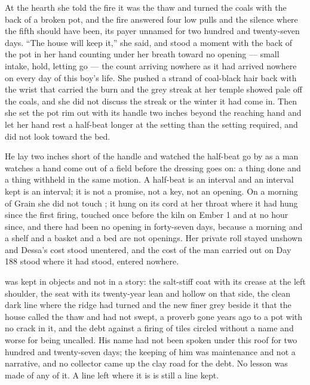 At the hearth she told the fire it was the thaw and turned the coals with the back of a broken pot, and the fire answered four low pulls and the silence where the fifth should have been, its payer unnamed for two hundred and twenty-seven days. “The house will keep it,” she said, and stood a moment with the back of the pot in her hand counting under her breath toward no opening --- small intake, hold, letting go --- the count arriving nowhere as it had arrived nowhere on every day of this boy's life. She pushed a strand of coal-black hair back with the wrist that carried the burn and the grey streak at her temple showed pale off the coals, and she did not discuss the streak or the winter it had come in. Then she set the pot rim out with its handle two inches beyond the reaching hand and let her hand rest a half-beat longer at the setting than the setting required, and did not look toward the bed.

He lay two inches short of the handle and watched the half-beat go by as a man watches a hand come out of a field before the dressing goes on: a thing done and a thing withheld in the same motion. A half-beat is an interval and an interval kept is an interval; it is not a promise, not a key, not an opening. On a morning of Grain she did not touch ; it hung on its cord at her throat where it had hung since the first firing, touched once before the kiln on Ember 1 and at no hour since, and there had been no opening in forty-seven days, because a morning and a shelf and a basket and a bed are not openings. Her private roll stayed unshown and Dessa's cost stood unentered, and the cost of the man carried out on Day 188 stood where it had stood, entered nowhere.

 was kept in objects and not in a story: the salt-stiff coat with its crease at the left shoulder, the seat with its twenty-year lean and hollow on that side, the clean dark line where the ridge had turned and the new finer grey beside it that the house called the thaw and had not swept, a proverb gone years ago to a pot with no crack in it, and the debt against a firing of tiles circled without a name and worse for being uncalled. His name had not been spoken under this roof for two hundred and twenty-seven days; the keeping of him was maintenance and not a narrative, and no collector came up the clay road for the debt. No lesson was made of any of it. A line left where it is is still a line kept.

